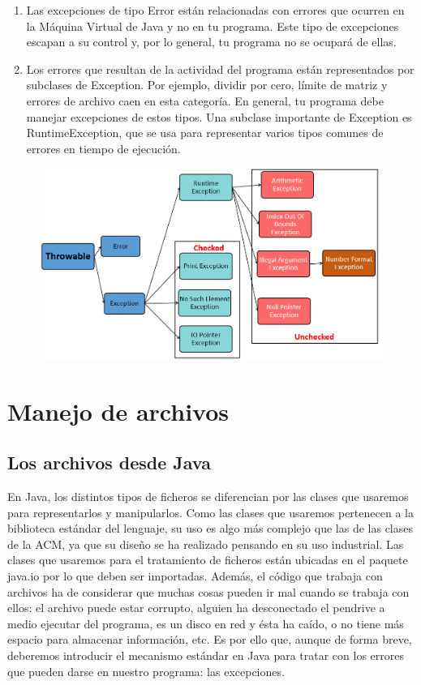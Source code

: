 \documentclass[12pt,a4paper]{report}
\begin{document}
{\begin{enumerate}
\item Las excepciones de tipo Error están relacionadas con errores que ocurren en la Máquina Virtual de Java y no en tu programa. Este tipo de excepciones escapan a su control y, por lo general, tu programa no se ocupará de ellas.
\item Los errores que resultan de la actividad del programa están representados por subclases de Exception. Por ejemplo, dividir por cero, límite de matriz y errores de archivo caen en esta categoría. En general, tu programa debe manejar excepciones de estos tipos. Una subclase importante de Exception es RuntimeException, que se usa para representar varios tipos comunes de errores en tiempo de ejecución.
\end{enumerate}
\begin{figure}[hbtp]
\centering
\includegraphics[scale=0.5]{ExcepcionesCheckedUnchecked.png}
\end{figure}

\section*{Manejo de archivos}
\subsection*{Los archivos desde Java}
En Java, los distintos tipos de ficheros se diferencian por las clases que usaremos para representarlos y manipularlos. Como las clases que usaremos pertenecen a la biblioteca estándar del lenguaje, su uso es algo más complejo que las de las clases de la ACM, ya que su diseño se ha realizado pensando en su uso industrial. Las clases que usaremos para el tratamiento de ficheros están ubicadas en el paquete java.io por lo que deben ser importadas. Además, el código que trabaja con archivos ha de considerar que muchas cosas pueden ir mal cuando se trabaja con ellos: el archivo puede estar corrupto, alguien ha desconectado el pendrive a medio ejecutar del programa, es un disco en red y ésta ha caído, o no tiene más espacio para almacenar información, etc.  Es por ello que, aunque de forma breve, deberemos introducir el mecanismo estándar en Java para tratar con los errores que pueden darse en nuestro programa: las excepciones.

}
\end{document}
